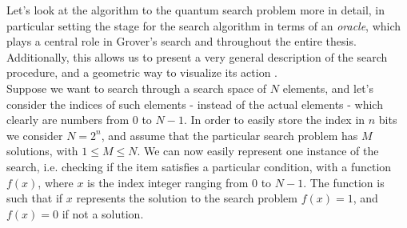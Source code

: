 Let's look at the algorithm to the quantum search problem more in detail, in particular setting the stage for the search algorithm in terms of an \textit{oracle}, which plays a central role in Grover's search and throughout the entire thesis. Additionally, this allows us to present a very general description of the search procedure, and a geometric way to visualize its action \cite{Nielsen2000}. \\
Suppose we want to search through a search space of $N$ elements, and let's consider the indices of such elements - instead of the actual elements - which clearly are numbers from 0 to $N-1$. In order to easily store the index in $n$ bits we consider $N=2^n$, and assume that the particular search problem has $M$ solutions, with $1\leq M\leq N$. We can now easily represent one instance of the search, i.e. checking if the item satisfies a particular condition, with a function $f(x)$, where $x$ is the index integer ranging from 0 to $N-1$. The function is such that if $x$ represents the solution to the search problem $f(x)=1$, and $f(x)=0$ if not a solution.




